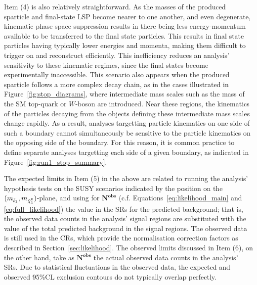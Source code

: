 Item (4) is also relatively straightforward.
As the masses of the produced sparticle and final-state LSP become nearer to one another, and even
degenerate, kinematic phase space suppression results in there being less energy-momentum available to be transferred to the final state
particles.
This results in final state particles having typically lower energies and momenta,
making them difficult to trigger on and reconstruct efficiently.
This inefficiency reduces an analysis' sensitivity to these kinematic regimes, since the final states become experimentally
inaccessible.
This scenario also appears when the produced sparticle follows a more complex decay chain,
as in the cases illustrated in Figure~\ref{fig:stop_diagrams}, where intermediate mass scales such as the
mass of the SM top-quark or $W$-boson are introduced.
Near these regions, the kinematics of the particles decaying from the objects defining these intermediate
mass scales change rapidly.
As a result, analyses targetting particle kinematics on one side of such a boundary
cannot simultaneously be sensitive to the particle kinematics on the opposing side of the boundary.
For this reason, it is common practice to define separate analyses targetting each side of a given boundary,
as indicated in Figure~\ref{fig:run1_stop_summary}.

The expected limits in Item (5) in the above are related to running the analysis' hypothesis tests
on the SUSY scenarios indicated by the position on the $(m_{\stopone}, m_{\ninoone})$-plane,
and using for $\bm{N^{\text{obs}}}$ (c.f. Equations~\ref{eq:likelihood_main} and \ref{eq:full_likelihood}) the value in the SRs for the predicted background; that is, the
observed data counts in the analysis' signal regions are substituted with the value of the total predicted
background in the signal regions.
The observed data is still used in the CRs, which provide the normalisation correction factors as described in Section~\ref{sec:likelihood}.
The observed limits discussed in Item (6), on the other hand, take as $\bm{N^{\text{obs}}}$ the actual observed data counts
in the analysis' SRs.
Due to statistical fluctuations in the observed data, the expected and observed 95\%CL exclusion contours
do not typically overlap perfectly.

